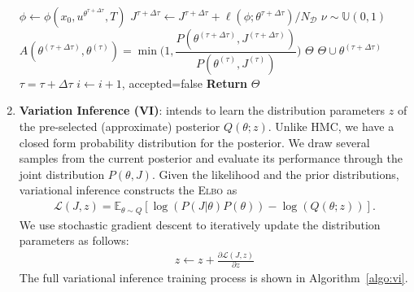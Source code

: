 \begin{enumerate}
\begin{algorithm}[H]
\begin{algorithmic}[1]
                    \State $\phi \leftarrow \phi(x_0, u^{\theta^{\tau + \Delta \tau}}, T) $
                    \State $J^{\tau + \Delta \tau}  \gets J^{\tau + \Delta \tau}  + \ell(\phi; \theta^{\tau + \Delta \tau})/N_{\mathcal{D}}$ 
                \EndFor
                \State $\nu \sim \mathbb{U}(0, 1)$
                \State $A(\theta^{(\tau + \Delta \tau)}, \theta^{(\tau)}) = \min \Biggl(1, \dfrac{P(\theta^{(\tau + \Delta \tau)}, J^{(\tau + \Delta \tau)})}{P(\theta^{(\tau)}, J^{(\tau)})} \Biggr)$
                    \State $\Theta$ \leftarrow \; $\Theta \cup \theta^{(\tau + \Delta \tau)}$ 
                    \State $\tau = \tau + \Delta \tau$
                    \Else
                    \State $i \leftarrow i + 1$, accepted=false
                \EndIf
            \EndWhile
        \EndWhile
        \State \textbf{Return} $\Theta$
        \end{algorithmic}
    \end{algorithm}

    \item \textbf{Variation Inference (VI)}: intends to learn the distribution
    parameters $z$ of the pre-selected (approximate) posterior $Q(\theta; z)$.
    Unlike HMC, we have a closed form probability distribution for the
    posterior. We draw several samples from the current posterior and evaluate
    its performance through the joint distribution $P(\theta, J)$. Given the
    likelihood and the prior distributions, variational inference constructs the
    \textsc{Elbo} as
    \begin{align}
        \mathcal{L}(J,z) = \mathbb{E}_{\theta \sim Q} \left[\log(P(J | \theta)P(\theta)) - \log(Q(\theta;z)) \right].    
        \label{eq:neuralpbc_elbo}    
    \end{align}
    We use stochastic gradient descent to iteratively update the distribution
    parameters as follows:
    \begin{align*}
      z \leftarrow z + \frac{ \partial \mathcal{L}(J,z)}{\partial z}
    \end{align*}
    The full variational inference training process is shown in
    Algorithm~\eqref{algo:vi}.
    

\end{enumerate}
